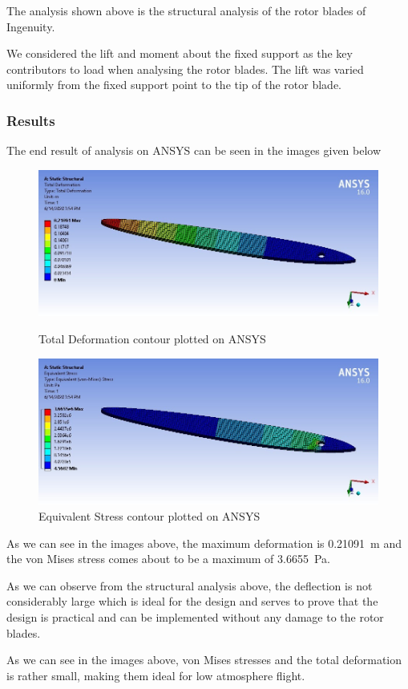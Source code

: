 \documentclass[preprint,12pt]{elsarticle}
\begin{document}
The analysis shown above is the structural analysis of the rotor blades of Ingenuity.

We considered the lift and moment about the fixed support as the key contributors to load when analysing the rotor blades. The lift was varied uniformly from the fixed support point to the tip of the rotor blade.

\subsubsection{\textbf{Results}}
{The end result of analysis on ANSYS can be seen in the images given below
\begin{figure}[H]
\centering\includegraphics[width=1.0\linewidth]{rotor mesh 1.png}
\caption{Total Deformation contour plotted on ANSYS}
\bigskip
\centering\includegraphics[width=1.0\linewidth]{rotor mesh 2.jpeg}
\caption{Equivalent Stress contour plotted on ANSYS}
\smallskip
\end{figure}
As we can see in the images above, the maximum deformation is \SI{0.21091}{\metre} and the 
von Mises stress comes about to be a maximum of \SI{3.6655}{\pascal}.

As we can observe from the structural analysis above, the deflection is not considerably large which is ideal for the design and serves to prove that the design is practical and can be implemented without any damage to the rotor blades.\par
As we can see in the images above, von Mises stresses and the total deformation is rather small, making them ideal for low atmosphere flight.}
\end{document}
